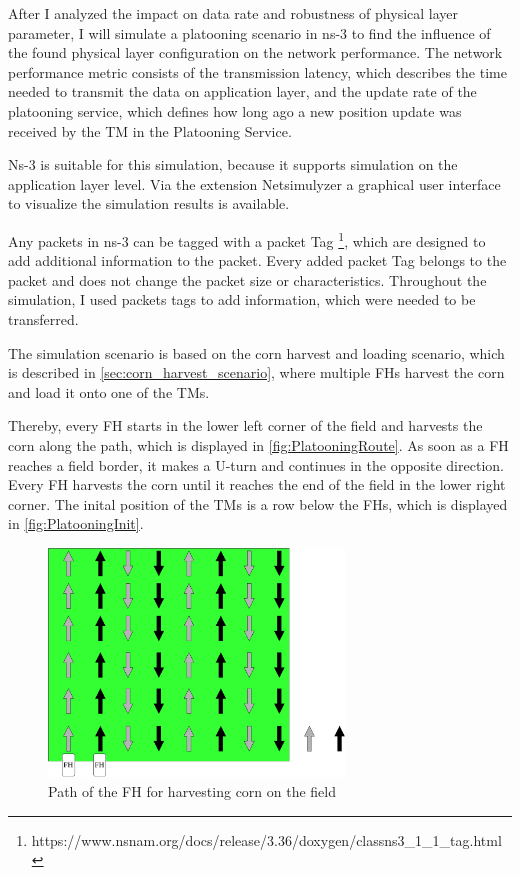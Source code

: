 After I analyzed the impact on data rate and robustness of physical layer parameter, I will simulate a platooning
scenario in ns-3 to find the influence of the found physical layer configuration on the network performance.
The network performance metric consists of the transmission latency, which describes the time needed to transmit the data
on application layer, and the update rate of the platooning service, which defines how long ago a new position update
was received by the \ac{TM} in the Platooning Service.

Ns-3 is suitable for this simulation, because it supports simulation on the application layer level. Via the extension Netsimulyzer
a graphical user interface to visualize the simulation results is available.

Any packets in ns-3 can be tagged with a packet Tag \footnote{https://www.nsnam.org/docs/release/3.36/doxygen/classns3_1_1_tag.html},
which are designed to add additional information to the packet. Every added packet Tag belongs to the packet and does not change
the packet size or characteristics. Throughout the simulation, I used packets tags to add information, which were needed to be
transferred.

The simulation scenario is based on the corn harvest and loading scenario, which is described in \autoref{sec:corn_harvest_scenario}, where
multiple \ac{FH}s harvest the corn and load it onto one of the \ac{TM}s.

Thereby, every \ac{FH} starts in the lower left corner of the field and harvests the corn along the path,
which is displayed in \autoref{fig:PlatooningRoute}. As soon as a \ac{FH} reaches a field border, it makes a U-turn and continues
in the opposite direction.
Every \ac{FH} harvests the corn until it reaches the end of the field in the lower right corner.
The inital position of the \ac{TM}s is a row below the \ac{FH}s, which is displayed in \autoref{fig:PlatooningInit}.
\begin{figure}[H]%
	\centering
	\includegraphics[width=0.7\textwidth]{figures/drawings-Route}
	\caption{Path of the \acf{FH} for harvesting corn on the field}
	\label{fig:PlatooningRoute}%
\end{figure}

